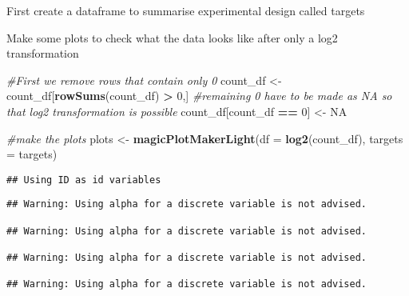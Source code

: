 \documentclass[]{article}
\newenvironment{Shaded}{\begin{snugshade}}{\end{snugshade}}
\newcommand{\CommentTok}[1]{\textcolor[rgb]{0.56,0.35,0.01}{\textit{#1}}}
\newcommand{\DataTypeTok}[1]{\textcolor[rgb]{0.13,0.29,0.53}{#1}}
\newcommand{\DecValTok}[1]{\textcolor[rgb]{0.00,0.00,0.81}{#1}}
\newcommand{\KeywordTok}[1]{\textcolor[rgb]{0.13,0.29,0.53}{\textbf{#1}}}
\newcommand{\NormalTok}[1]{#1}
\newcommand{\OperatorTok}[1]{\textcolor[rgb]{0.81,0.36,0.00}{\textbf{#1}}}
\newcommand{\OtherTok}[1]{\textcolor[rgb]{0.56,0.35,0.01}{#1}}
\newcommand{\StringTok}[1]{\textcolor[rgb]{0.31,0.60,0.02}{#1}}
\begin{document}
First create a dataframe to summarise experimental design called targets

\begin{Shaded}
\end{Shaded}

Make some plots to check what the data looks like after only a log2
transformation

\begin{Shaded}
\begin{Highlighting}[]
\CommentTok{#First we remove rows that contain only 0}
\NormalTok{count_df <-}\StringTok{ }\NormalTok{count_df[}\KeywordTok{rowSums}\NormalTok{(count_df) }\OperatorTok{>}\StringTok{ }\DecValTok{0}\NormalTok{,]}
\CommentTok{#remaining 0 have to be made as NA so that log2 transformation is possible}
\NormalTok{count_df[count_df }\OperatorTok{==}\StringTok{ }\DecValTok{0}\NormalTok{] <-}\StringTok{ }\OtherTok{NA}
\end{Highlighting}
\end{Shaded}

\begin{Shaded}
\begin{Highlighting}[]
\CommentTok{#make the plots}
\NormalTok{plots <-}\StringTok{ }\KeywordTok{magicPlotMakerLight}\NormalTok{(}\DataTypeTok{df =} \KeywordTok{log2}\NormalTok{(count_df), }\DataTypeTok{targets =}\NormalTok{ targets)}
\end{Highlighting}
\end{Shaded}

\begin{verbatim}
## Using ID as id variables
\end{verbatim}

\begin{verbatim}
## Warning: Using alpha for a discrete variable is not advised.

## Warning: Using alpha for a discrete variable is not advised.

## Warning: Using alpha for a discrete variable is not advised.

## Warning: Using alpha for a discrete variable is not advised.
\end{verbatim}
\end{document}
